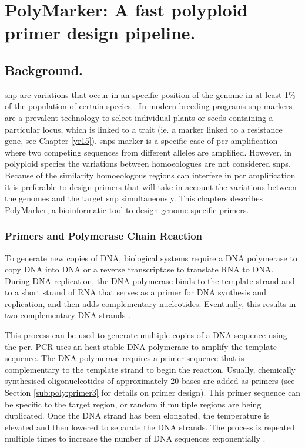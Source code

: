 
\chapter{PolyMarker: A fast polyploid primer design pipeline.}
\glsresetall
\label{cha:polymarker}
\section{Background.}


\gls{snp} are variations that occur in an specific position of the genome in at least 1\% of the population of certain species \citep{Jehan2006}. 
In modern breeding programs \gls{snp} markers are a prevalent technology to select individual plants or seeds containing a particular locus, which is linked to a trait (ie. a marker linked to a resistance gene, see Chapter \ref{yr15}). 
\glspl{snp} marker is a specific case of \gls{pcr} amplification where two competing sequences from different alleles are amplified. 
However, in polyploid species the variations between homoeologues are not considered \glspl{snp}.
Because of the similarity homoeologous regions can interfere in \gls{pcr} amplification it is preferable to design primers that will take in account the variations between the genomes and the target \gls{snp} simultaneously. 
This chapters describes PolyMarker, a bioinformatic tool to design genome-specific primers. 


\subsection{Primers and Polymerase Chain Reaction}
\label{sub:poly:pcr}
To generate new copies of DNA, biological systems require a DNA polymerase to copy DNA into DNA or a reverse transcriptase to translate RNA to DNA. During DNA replication, the DNA polymerase binds to the template strand and to a short strand of RNA that serves as a primer for DNA synthesis and replication, and then adds complementary nucleotides. Eventually, this results in two complementary DNA strands \citep{mullis1987process}.

This process can be used to generate multiple copies of a DNA sequence using the \gls{pcr}. 
PCR uses an heat-stable DNA polymerase to amplify the template sequence. 
The DNA polymerase requires a primer sequence that is complementary to the template strand to begin the reaction. Usually, chemically synthesised oligonucleotides of approximately 20 bases are added as primers (see Section \ref{sub:poly:primer3} for details on primer design). 
This primer sequence can be specific to the target region, or random if multiple regions are being duplicated. 
Once the DNA strand has been elongated, the temperature is elevated and then lowered to separate the DNA strands. 
The process is repeated multiple times to increase the number of DNA sequences exponentially \cite{alberts2014molecular}.

